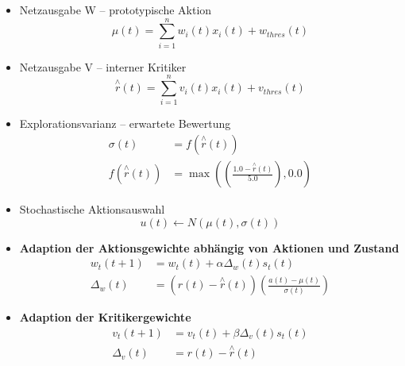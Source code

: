 \begin{itemize}
	\item Netzausgabe W -- prototypische Aktion
	\begin{equation*}
		\mu(t) = \sum_{i = 1}^{n} w_i(t) x_i(t) + w_{thres}(t)
	\end{equation*}
	\item Netzausgabe V -- interner Kritiker
	\begin{equation*}
		\overset{\wedge}{r}(t) = \sum_{i = 1}^{n} v_i(t) x_i(t) + v_{thres}(t)
	\end{equation*}
	\item Explorationsvarianz -- erwartete Bewertung
	\begin{align*}
		\sigma(t) &= f(\overset{\wedge}{r}(t)) \\
		f(\overset{\wedge}{r}(t)) &= \max \left(\left( \frac{1.0 - \overset{\wedge}{r}(t)}{5.0}\right), 0.0\right)
	\end{align*}
	\item Stochastische Aktionsauswahl
	\begin{equation*}
		u(t) \leftarrow N (\mu (t), \sigma (t))
	\end{equation*}
	\item \textbf{Adaption der Aktionsgewichte abhängig von Aktionen und Zustand}
	\begin{align*}
		w_t(t+1) &= w_t(t) + \alpha \Delta_w (t) s_t (t) \\
		\Delta_w(t) &= \left(r(t) - \overset{\wedge}{r}(t)\right)\left(\frac{a(t) - \mu (t)}{\sigma (t)}\right)
	\end{align*}
	\item \textbf{Adaption der Kritikergewichte}
	\begin{align*}
		v_t(t+1) &= v_t(t) + \beta \Delta_v (t) s_t(t) \\
		\Delta_v(t) &= r(t) - \overset{\wedge}{r}(t)
	\end{align*}
\end{itemize}

